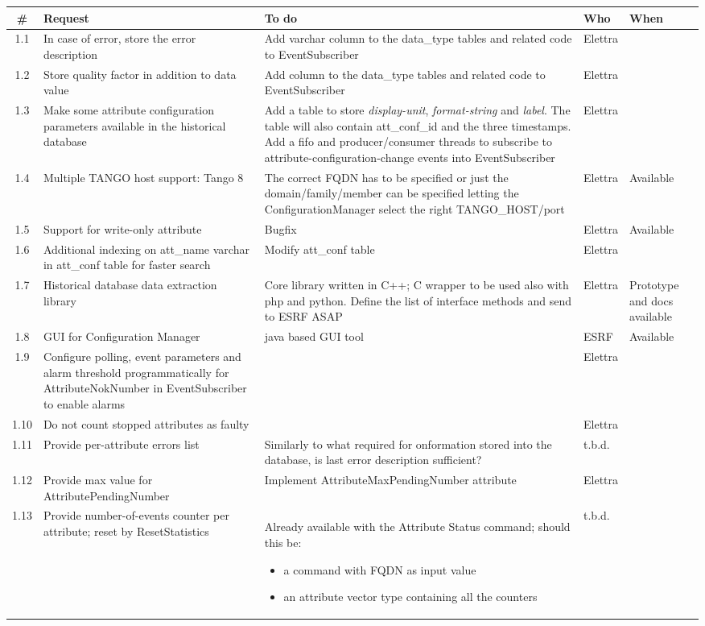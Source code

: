 \documentclass[11pt,a4paper]{article}
\begin{document}
\begin{longtable}{|c|p{6.0cm}|p{6.0cm}|p{1.0cm}|p{1.4cm}|}
	\hline
	\bf{\#} & \bf{Request} & \bf{To do} & \bf{Who} & \bf{When} \\
	\hline
	\endhead
	1.1 &
	In case of error, store the error description &
	Add varchar column to the data\_type tables and related code
	to EventSubscriber &
	Elettra &
	\\
	\hline
	1.2 &
	Store quality factor in addition to data value &
	Add column to the data\_type tables and related code
	to EventSubscriber &
	Elettra &
	\\
	\hline
	1.3 &
	Make some attribute configuration parameters available
	in the historical database &
	Add a table to store \emph{display-unit}, \emph{format-string}
	and \emph{label}. The table will also contain att\_conf\_id and
	the three timestamps.
	Add a fifo and producer/consumer threads to subscribe
	to attribute-configuration-change events into EventSubscriber &
	Elettra &
	\\
	\hline
	1.4 &
	Multiple TANGO host support: Tango 8 &
	The correct FQDN has to be specified or just the
	domain/family/member can be specified letting the
	ConfigurationManager select the right TANGO\_HOST/port &
	Elettra &
	Available \\
	\hline
	1.5 &
	Support for write-only attribute &
	Bugfix &
	Elettra &
	Available \\
	\hline
	1.6 &
	Additional indexing on att\_name varchar in att\_conf table
	for faster search &
	Modify att\_conf table &
	Elettra &
	\\
	\hline
	1.7 &
	Historical database data extraction library &
	Core library written in C++; C wrapper to be used
	also with php and python. Define the list of interface methods
	and send to ESRF ASAP &
	Elettra &
	Prototype and docs available \\
	\hline
	1.8 &
	GUI for Configuration Manager &
	java based GUI tool &
	ESRF &
	Available\\
	\hline
	1.9 &
	Configure polling, event parameters and alarm threshold
	programmatically for AttributeNokNumber in EventSubscriber
	to enable alarms &
	&
	Elettra &
	\\
	\hline
	1.10 &
	Do not count stopped attributes as faulty &
	&
	Elettra &
	\\
	\hline
	1.11 &
	Provide per-attribute errors list&
	Similarly to what required for onformation stored into the
	database, is last error description sufficient? &
	t.b.d. &
	\\
	\hline
	1.12 &
	Provide max value for AttributePendingNumber &
	Implement AttributeMaxPendingNumber attribute &
	Elettra &
	\\
	\hline
	1.13 &
	Provide number-of-events counter per attribute; reset by ResetStatistics &
	Already available with the Attribute Status command; should this be:
	\begin{itemize}
		\item a command with FQDN as input value
		\item an attribute vector type containing all the counters
	\end{itemize} &
	t.b.d. &
	\\
	\hline
\end{longtable}
\end{document}
